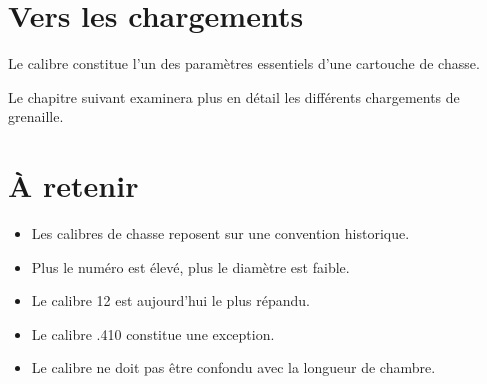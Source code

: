 \section{Vers les chargements}

Le calibre constitue l'un des paramètres essentiels d'une cartouche de chasse.

Le chapitre suivant examinera plus en détail les différents chargements de
grenaille.

\section{À retenir}

\begin{aretenir}

\begin{itemize}
    \item Les calibres de chasse reposent sur une convention historique.
    \item Plus le numéro est élevé, plus le diamètre est faible.
    \item Le calibre 12 est aujourd'hui le plus répandu.
    \item Le calibre .410 constitue une exception.
    \item Le calibre ne doit pas être confondu avec la longueur de chambre.
\end{itemize}

\end{aretenir}
